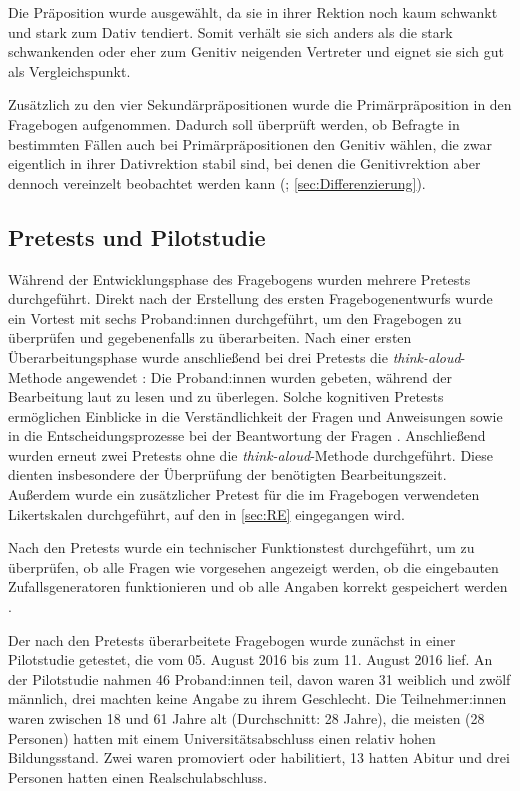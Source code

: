 Die Präposition  wurde ausgewählt, da sie in ihrer Rektion noch kaum schwankt und stark zum Dativ tendiert. Somit verhält sie sich anders als die stark schwankenden oder eher zum Genitiv neigenden Vertreter und eignet sie sich gut als Vergleichspunkt. 

Zusätzlich zu den vier Sekundärpräpositionen wurde die Primärpräposition  in den Fragebogen aufgenommen. Dadurch soll überprüft werden, ob Befragte in bestimmten Fällen auch bei Primärpräpositionen den Genitiv wählen, die zwar eigentlich in ihrer Dativrektion stabil sind, bei denen die Genitivrektion aber dennoch vereinzelt beobachtet werden kann (\cites[s.][211]{DiMeola2009}[227]{DiMeola2011}; \autoref{sec:Differenzierung}). 


\subsection{Pretests und Pilotstudie}
\label{sec:PretestPilot}
\largerpage
\begin{sloppypar}
Während der Entwicklungsphase des Fragebogens wurden mehrere Pretests durchgeführt. Direkt nach der Erstellung des ersten Fragebogenentwurfs wurde ein Vortest mit sechs Proband:innen durchgeführt, um den Fragebogen zu überprüfen und gegebenenfalls zu überarbeiten. Nach einer ersten Überarbeitungsphase wurde anschließend bei drei Pretests die \textit{think-aloud}-Methode angewendet \citep[s.][194]{Porst2014}: Die Proband:innen wurden gebeten, während der Bearbeitung laut zu lesen und zu überlegen. Solche kognitiven Pretests ermöglichen Einblicke in die Verständlichkeit der Fragen und Anweisungen sowie in die Entscheidungsprozesse bei der Beantwortung der Fragen \citep[s.][195--196]{Porst2014}. Anschließend wurden erneut zwei Pretests ohne die \textit{think-aloud}-Methode durchgeführt. Diese dienten insbesondere der Überprüfung der benötigten Bearbeitungszeit. Außerdem wurde ein zusätzlicher Pretest für die im Fragebogen verwendeten Likertskalen durchgeführt, auf den in \autoref{sec:RE} eingegangen wird.
\end{sloppypar}

Nach den Pretests wurde ein technischer Funktionstest durchgeführt, um zu überprüfen, ob alle Fragen wie vorgesehen angezeigt werden, ob die eingebauten Zufallsgeneratoren funktionieren und ob alle Angaben korrekt gespeichert werden \citep[s.][]{Leiner2014}. 

Der nach den Pretests überarbeitete Fragebogen wurde zunächst in einer Pilotstudie getestet, die vom 05. August 2016 bis zum 11. August 2016 lief. An der Pilotstudie nahmen 46 Proband:innen teil, davon waren 31 weiblich und zwölf männlich, drei machten keine Angabe zu ihrem Geschlecht. Die Teilnehmer:innen waren zwischen 18 und 61 Jahre alt (Durchschnitt: 28 Jahre), die meisten (28 Personen) hatten mit einem Universitätsabschluss einen relativ hohen Bildungsstand. Zwei waren promoviert oder habilitiert, 13 hatten Abitur und drei Personen hatten einen Realschulabschluss. 

